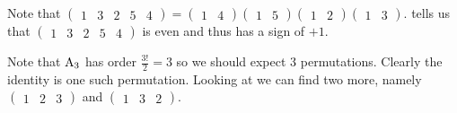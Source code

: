 \begin{questions}
    \item Note that $\begin{pmatrix}1&3&2&5&4\end{pmatrix} = \begin{pmatrix}1&4\end{pmatrix}\begin{pmatrix}1&5\end{pmatrix}\begin{pmatrix}1&2\end{pmatrix}\begin{pmatrix}1&3\end{pmatrix}$.  tells us that $\begin{pmatrix}1&3&2&5&4\end{pmatrix}$ is even and thus has a sign of $+1$.

    \item Note that $\mathrm{A}_{3}$ has order $\frac{3!}{2} = 3$ so we should expect 3 permutations. Clearly the identity is one such permutation. Looking at  we can find two more, namely $\begin{pmatrix}1&2&3\end{pmatrix}$ and $\begin{pmatrix}1&3&2\end{pmatrix}$.
    

\end{questions}
